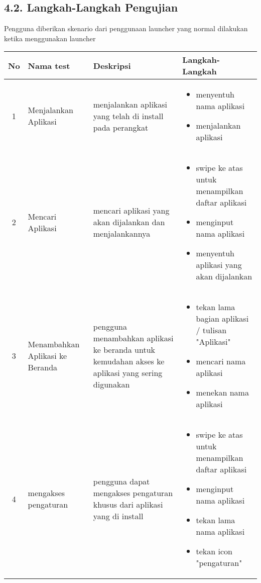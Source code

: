 \documentclass[a4paper, 12pt]{article}
\begin{document}
\subsection*{4.2. Langkah-Langkah Pengujian}
Pengguna diberikan skenario dari penggunaan launcher yang normal dilakukan ketika menggunakan launcher
\begin{table}[H]
  \begin{tabularx}{\textwidth}{|c|X|X|X|}
  \hline
  No & Nama test & Deskripsi & Langkah-Langkah \\
  \hline
1 & Menjalankan Aplikasi & menjalankan aplikasi yang telah di install pada perangkat &\begin{itemize}\item menyentuh nama aplikasi \item menjalankan aplikasi \end{itemize} \\
  \hline
2 & Mencari Aplikasi & mencari aplikasi yang akan dijalankan dan menjalankannya & \begin{itemize}\item swipe ke atas untuk menampilkan daftar aplikasi \item menginput nama aplikasi \item menyentuh aplikasi yang akan dijalankan\end{itemize} \\
  \hline
  3 & Menambahkan Aplikasi ke Beranda & pengguna menambahkan aplikasi ke beranda untuk kemudahan akses ke aplikasi yang sering digunakan & \begin{itemize}
    \item tekan lama bagian aplikasi / tulisan "Aplikasi"
    \item mencari nama aplikasi 
    \item menekan nama aplikasi
  \end{itemize} \\
  \hline
  4 & mengakses pengaturan & pengguna dapat mengakses pengaturan khusus dari aplikasi yang di install & \begin{itemize}
    \item swipe ke atas untuk menampilkan daftar aplikasi
    \item menginput nama aplikasi
    \item tekan lama nama aplikasi
    \item tekan icon "pengaturan"
  \end{itemize} \\
  \hline
\end{tabularx}
\end{table}
\end{document}
